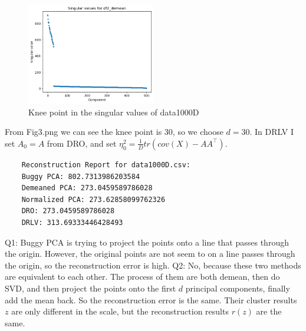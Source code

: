 \begin{soln}
  \begin{figure}[h]
    \centering
    \includegraphics[width=0.5\textwidth]{Fig3.png}
    \caption{Knee point in the singular values of data1000D}
    \label{fig:obj}
  \end{figure}
  From Fig3.png we can see the knee point is 30, so we choose $d=30$.
  In DRLV I set $A_0 = A$ from DRO, and set $\eta_0^2 = \frac{1}{D} tr(cov(X) - AA^\top)$.
  \begin{verbatim}
    Reconstruction Report for data1000D.csv:
    Buggy PCA: 802.7313986203584
    Demeaned PCA: 273.0459589786028
    Normalized PCA: 273.62858099762326
    DRO: 273.0459589786028
    DRLV: 313.69333446428493
  \end{verbatim}
    Q1: Buggy PCA is trying to project the points onto a line that passes through the origin. However, the original points are not seem to on a line passes through the origin, so the reconstruction error is high.
    Q2: No, because these two methods are equivalent to each other. The process of them are both demean, then do SVD, and then project the points onto the first $d$ principal components, finally add the mean back. So the reconstruction error is the same. Their cluster results $z$ are only different in the scale, but the reconstruction results $r(z)$ are the same.
\end{soln}


\vspace{0.2in}



